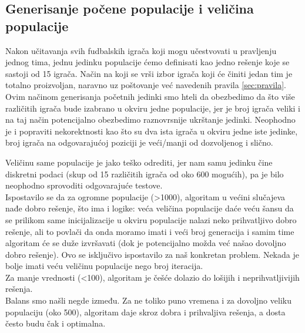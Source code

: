 \documentclass[a4paper]{article}
\begin{document}
\subsection{Generisanje počene populacije i veličina populacije}
Nakon učitavanja svih fudbalskih igrača koji mogu učestvovati u pravljenju jednog tima, jednu jedinku populacije ćemo definisati kao jedno rešenje koje se sastoji od 15 igrača. Način na koji se vrši izbor igrača koji će činiti jedan tim je totalno proizvoljan, naravno uz poštovanje već navedenih pravila \ref{sec:pravila}. Ovim načinom generisanja početnih jedinki smo hteli da obezbedimo da što više različitih igrača bude izabrano u okviru jedne populacije, jer je broj igrača veliki i na taj način potencijalno obezbedimo raznovrsnije ukrštanje jedinki. Neophodno je i popraviti nekorektnosti kao što su dva ista igrača u okviru jedne iste jedinke, broj igrača na odgovarajućoj poziciji je veći/manji od dozvoljenog i slično.

Veličinu same populacije je jako teško odrediti, jer nam samu jedinku čine diskretni podaci (skup od 15 različitih igrača od oko 600 mogućih), pa je bilo neophodno sprovoditi odgovarajuće testove.\\
Ispostavilo se da za ogromne populacije (>1000), algoritam u većini slučajeva nađe dobro rešenje, što ima i logike: veća veličina populacije daće veću šansu da se prilikom same inicijalizacije u okviru populacije nalazi neko prihvatljivo dobro rešenje, ali to povlači da onda moramo imati i veći broj generacija i samim time algoritam će se duže izvršavati (dok je potencijalno možda već našao dovoljno dobro rešenje). Ovo se isključivo ispostavilo za naš konkretan problem. Nekada je bolje imati veću veličinu populacije nego broj iteracija. \cite{manyGenerations} \\
Za manje vrednosti (<100), algoritam je češće dolazio do lošijih i neprihvatljivijih rešenja. \\
Balans smo našli negde između. Za ne toliko puno vremena i za dovoljno veliku populaciju (oko 500), algoritam daje skroz dobra i prihvaljiva rešenja, a dosta često budu čak i optimalna. \cite{optimalPopulationSize}
\end{document}
